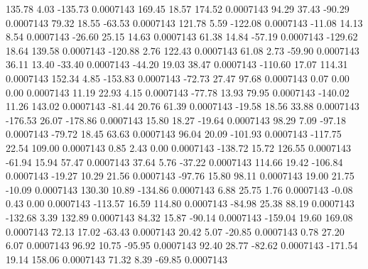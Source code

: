      135.78        4.03     -135.73     0.0007143
      169.45       18.57      174.52     0.0007143
       94.29       37.43      -90.29     0.0007143
       79.32       18.55      -63.53     0.0007143
      121.78        5.59     -122.08     0.0007143
      -11.08       14.13        8.54     0.0007143
      -26.60       25.15       14.63     0.0007143
       61.38       14.84      -57.19     0.0007143
     -129.62       18.64      139.58     0.0007143
     -120.88        2.76      122.43     0.0007143
       61.08        2.73      -59.90     0.0007143
       36.11       13.40      -33.40     0.0007143
      -44.20       19.03       38.47     0.0007143
     -110.60       17.07      114.31     0.0007143
      152.34        4.85     -153.83     0.0007143
      -72.73       27.47       97.68     0.0007143
        0.07        0.00        0.00     0.0007143
       11.19       22.93        4.15     0.0007143
      -77.78       13.93       79.95     0.0007143
     -140.02       11.26      143.02     0.0007143
      -81.44       20.76       61.39     0.0007143
      -19.58       18.56       33.88     0.0007143
     -176.53       26.07     -178.86     0.0007143
       15.80       18.27      -19.64     0.0007143
       98.29        7.09      -97.18     0.0007143
      -79.72       18.45       63.63     0.0007143
       96.04       20.09     -101.93     0.0007143
     -117.75       22.54      109.00     0.0007143
        0.85        2.43        0.00     0.0007143
     -138.72       15.72      126.55     0.0007143
      -61.94       15.94       57.47     0.0007143
       37.64        5.76      -37.22     0.0007143
      114.66       19.42     -106.84     0.0007143
      -19.27       10.29       21.56     0.0007143
      -97.76       15.80       98.11     0.0007143
       19.00       21.75      -10.09     0.0007143
      130.30       10.89     -134.86     0.0007143
        6.88       25.75        1.76     0.0007143
       -0.08        0.43        0.00     0.0007143
     -113.57       16.59      114.80     0.0007143
      -84.98       25.38       88.19     0.0007143
     -132.68        3.39      132.89     0.0007143
       84.32       15.87      -90.14     0.0007143
     -159.04       19.60      169.08     0.0007143
       72.13       17.02      -63.43     0.0007143
       20.42        5.07      -20.85     0.0007143
        0.78       27.20        6.07     0.0007143
       96.92       10.75      -95.95     0.0007143
       92.40       28.77      -82.62     0.0007143
     -171.54       19.14      158.06     0.0007143
       71.32        8.39      -69.85     0.0007143
